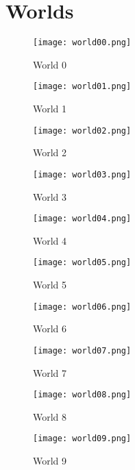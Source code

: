 \chapter{Worlds}
\label{sec:world_images}
\begin{figure}[H]
	\centering
	\texttt{[image: world00.png]}
	\caption{World 0}
	\label{fig:world0}
\end{figure}

\begin{figure}[H]
	\centering
	\texttt{[image: world01.png]}
	\caption{World 1}
	\label{fig:world1}
\end{figure}

\begin{figure}[H]
	\centering
	\texttt{[image: world02.png]}
	\caption{World 2}
	\label{fig:world2}
\end{figure}

\begin{figure}[H]
	\centering
	\texttt{[image: world03.png]}
	\caption{World 3}
	\label{fig:world3}
\end{figure}

\begin{figure}[H]
	\centering
	\texttt{[image: world04.png]}
	\caption{World 4}
	\label{fig:world4}
\end{figure}

\begin{figure}[H]
	\centering
	\texttt{[image: world05.png]}
	\caption{World 5}
	\label{fig:world5}
\end{figure}

\begin{figure}[H]
	\centering
	\texttt{[image: world06.png]}
	\caption{World 6}
	\label{fig:world6}
\end{figure}

\begin{figure}[H]
	\centering
	\texttt{[image: world07.png]}
	\caption{World 7}
	\label{fig:world7}
\end{figure}

\begin{figure}[H]
	\centering
	\texttt{[image: world08.png]}
	\caption{World 8}
	\label{fig:world8}
\end{figure}

\begin{figure}[H]
	\centering
	\texttt{[image: world09.png]}
	\caption{World 9}
	\label{fig:world9}
\end{figure}
